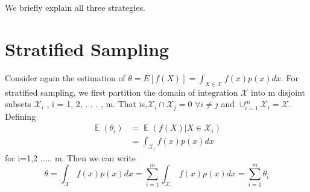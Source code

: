 \documentclass[a4paper,twoside]{iiththesis}
\theoremstyle{definition}
\theoremstyle{definition}
\theoremstyle{remark}
\DeclareMathOperator*{\E}{\mathop{\mathbb{E}}}
\begin{document}
We  briefly explain all three strategies.
\newpage
\section{Stratified Sampling}


Consider again the estimation of  $\theta = E[f(X)] =\int_{X\in\mathcal{X}} f(x) p(x) dx $. For stratified sampling, we first partition the domain of integration $\mathcal{X}$ into m disjoint subsets
$\mathcal{X}_i$ , i = 1, 2, . . . , m. That is,$ \mathcal{X}_i \cap \mathcal{X}_j = 0$ $ \forall i \neq j$ and $\cup_{i=1}^m \mathcal{X}_i= \mathcal{X}$. Defining 
\begin{align}
\E (\theta_i) &= \E (f(X) | X\in \mathcal{X}_i)\\
					&= \int_{\mathcal{X}_i} f(x) p(x) dx
\end{align}
for i=1,2 ..... m. Then we can write 
\begin{equation}
		\theta = \int_{\mathcal{X}} f(x) p(x) dx = \sum_{i=1}^m \int_{\mathcal{X}_i} f(x) p(x) dx = \sum_{i=1}^m \theta_i
\end{equation}
\end{document}
